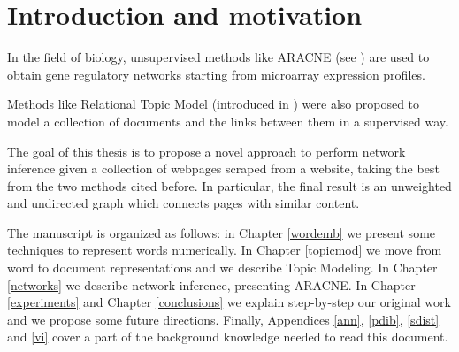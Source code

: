 \chapter{Introduction and motivation}

In the field of biology, unsupervised methods like ARACNE (see \cite{DBLP:journals/bmcbi/MargolinNBWSFC06}) 
are used to obtain gene regulatory networks starting from microarray expression profiles. 

Methods like Relational Topic Model (introduced in \cite{pmlr-v5-chang09a}) were also proposed to 
model a collection of documents and the links between them in a supervised way. 

The goal of this thesis is to propose a novel approach to perform network inference given a collection of 
webpages scraped from a website, taking the best from the two methods cited before. 
In particular, the final result is an unweighted and undirected graph which connects pages with similar content.

The manuscript is organized as follows: 
in Chapter \ref{wordemb} we present some techniques to represent words numerically. 
In Chapter \ref{topicmod} we move from word to document representations and we describe Topic Modeling. 
In Chapter \ref{networks} we describe network inference, presenting ARACNE.
In Chapter \ref{experiments} and Chapter \ref{conclusions} we explain step-by-step our original work 
and we propose some future directions. 
Finally, Appendices \ref{ann}, \ref{pdib}, \ref{sdist} and \ref{vi} cover a part of the background knowledge needed to read this document.